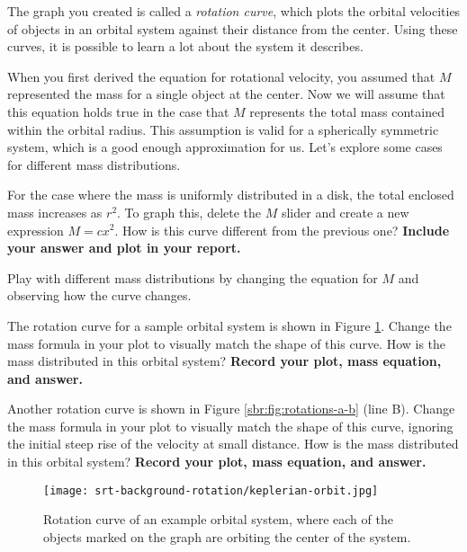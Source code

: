 The graph you created is called a \textit{rotation curve}, which plots the orbital velocities of objects in an orbital system against their distance from the center. Using these curves, it is possible to learn a lot about the system it describes.

When you first derived the equation for rotational velocity, you assumed that $M$ represented the mass for a single object at the center. Now we will assume that this equation holds true in the case that $M$ represents the total mass contained within the orbital radius. This assumption is valid for a spherically symmetric system, which is a good enough approximation for us. Let's explore some cases for different mass distributions.

\begin{steps}
	
	\item For the case where the mass is uniformly distributed in a disk, the total enclosed mass increases as $r^2$. To graph this, delete the $M$ slider and create a new expression $M = c x^2$. How is this curve different from the previous one? \textbf{Include your answer and plot in your report.}
	
	\item Play with different mass distributions by changing the equation for $M$ and observing how the curve changes.
	
	\item The rotation curve for a sample orbital system is shown in Figure \ref{sbr:fig:solar-rot}. Change the mass formula in your plot to visually match the shape of this curve. How is the mass distributed in this orbital system? \textbf{Record your plot, mass equation, and answer.}
	
	\item Another rotation curve is shown in Figure \ref{sbr:fig:rotations-a-b} (line B). Change the mass formula in your plot to visually match the shape of this curve, ignoring the initial steep rise of the velocity at small distance. How is the mass distributed in this orbital system? \textbf{Record your plot, mass equation, and answer.}
\end{steps}

\begin{figure}
	\centering
	\texttt{[image: srt-background-rotation/keplerian-orbit.jpg]}
	\caption{Rotation curve of an example orbital system, where each of the objects marked on the graph are orbiting the center of the system.}\label{sbr:fig:solar-rot}
\end{figure}

